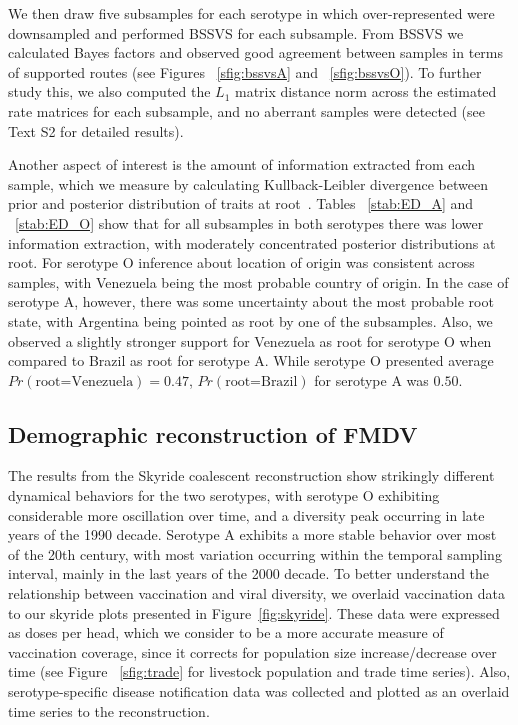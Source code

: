 \documentclass[10pt]{article}
\begin{document}
We then draw five subsamples for each serotype in which over-represented were downsampled and performed BSSVS for each subsample.
From BSSVS we calculated Bayes factors and observed good agreement between samples in terms of supported routes (see Figures ~\ref{sfig:bssvsA} and ~\ref{sfig:bssvsO}).
To further study this, we also computed the $L_1$ matrix distance norm across the estimated rate matrices for each subsample, and no aberrant samples were detected (see Text S2 for detailed results).

Another aspect of interest is the amount of information extracted from each sample, which we measure by calculating Kullback-Leibler divergence between prior and posterior distribution of traits at root~\cite{roots}.
Tables ~\ref{stab:ED_A} and ~\ref{stab:ED_O} show that for all subsamples in both serotypes there was lower information extraction, with moderately concentrated posterior distributions at root.
For serotype O inference about location of origin was consistent across samples, with Venezuela being the most probable country of origin.
In the case of serotype A, however, there was some uncertainty about the most probable root state, with Argentina being pointed as root by one of the subsamples.
Also, we observed a slightly stronger support for Venezuela as root for serotype O when compared to Brazil as root for serotype A.
While serotype O presented average $Pr(\text{root=Venezuela})=0.47$, $Pr(\text{root=Brazil})$ for serotype A was $0.50$.

\subsection*{Demographic reconstruction of FMDV}

The results from the Skyride coalescent reconstruction show strikingly different dynamical behaviors for the two serotypes, with serotype O exhibiting considerable more oscillation over time, and a diversity peak occurring in late years of the 1990 decade.
Serotype A exhibits a more stable behavior over most of the 20th century, with most variation occurring within the temporal sampling interval, mainly in the last years of the 2000 decade.
To better understand the relationship between vaccination and viral diversity, we overlaid vaccination data to our skyride plots presented in Figure~\ref{fig:skyride}.
These data were expressed as doses per head, which we consider to be a more accurate measure of vaccination coverage, since it corrects for population size increase/decrease over time (see Figure ~\ref{sfig:trade} for livestock population and trade time series). 
Also, serotype-specific disease notification data was collected and plotted as an overlaid time series to the reconstruction. 
\end{document}
